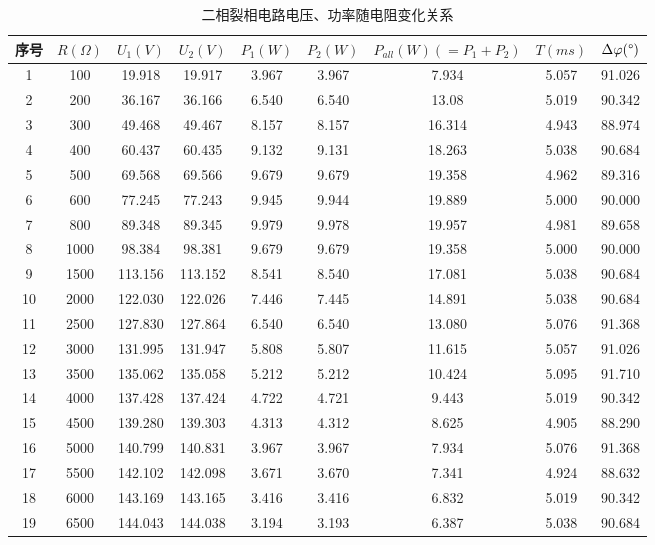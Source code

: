 \documentclass[12pt]{article}%
\begin{document}
\begin{table}[htbp]
  \centering
  \caption{\heiti{}二相裂相电路电压、功率随电阻变化关系}
    \begin{tabular}{ccccccccc}
    \hline
    序号 & $R(\Omega)$ & $U_1(V)$ & $U_2(V)$ & $P_1(W)$ & $P_2(W)$ & $P_{all}(W)(=P_1+P_2)$ &$ T(ms)$  & $\Delta \varphi( \degree )$ \\
    \hline
1  & 100 & 19.918 & 19.917 & 3.967 & 3.967 & 7.934 & 5.057  & 91.026  \\
2  & 200 & 36.167 & 36.166 & 6.540 & 6.540 & 13.08 & 5.019  & 90.342  \\
3  & 300 & 49.468 & 49.467 & 8.157 & 8.157 & 16.314 & 4.943  & 88.974  \\
4  & 400 & 60.437 & 60.435 & 9.132 & 9.131 & 18.263 & 5.038  & 90.684  \\
5  & 500 & 69.568  & 69.566  & 9.679  & 9.679  & 19.358  & 4.962  & 89.316  \\
6  & 600 & 77.245 & 77.243 & 9.945 & 9.944 & 19.889 & 5.000  & 90.000  \\
7  & 800 & 89.348 & 89.345 & 9.979 & 9.978 & 19.957 & 4.981  & 89.658  \\
8  & 1000 & 98.384  & 98.381  & 9.679  & 9.679  & 19.358  & 5.000  & 90.000  \\
9  & 1500 & 113.156  & 113.152  & 8.541  & 8.540  & 17.081  & 5.038  & 90.684  \\
10 & 2000 & 122.030  & 122.026  & 7.446  & 7.445  & 14.891  & 5.038  & 90.684  \\
11 & 2500 & 127.830  & 127.864  & 6.540  & 6.540  & 13.080  & 5.076  & 91.368  \\
12 & 3000 & 131.995  & 131.947  & 5.808  & 5.807  & 11.615  & 5.057  & 91.026  \\
13 & 3500 & 135.062  & 135.058  & 5.212  & 5.212  & 10.424  & 5.095  & 91.710  \\
14 & 4000 & 137.428  & 137.424  & 4.722  & 4.721  & 9.443  & 5.019  & 90.342  \\
15 & 4500 & 139.280  & 139.303  & 4.313  & 4.312  & 8.625  & 4.905  & 88.290  \\
16 & 5000 & 140.799  & 140.831  & 3.967  & 3.967  & 7.934  & 5.076  & 91.368  \\
17 & 5500 & 142.102  & 142.098  & 3.671  & 3.670  & 7.341  & 4.924  & 88.632  \\
18 & 6000 & 143.169  & 143.165  & 3.416  & 3.416  & 6.832  & 5.019  & 90.342  \\
19 & 6500 & 144.043  & 144.038  & 3.194  & 3.193  & 6.387  & 5.038  & 90.684  \\

\end{tabular}
\end{table}
\end{document}
